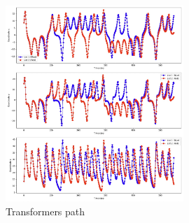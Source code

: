 \documentclass[11pt]{article}
\begin{document}
\begin{figure}[h]
\centering
\includegraphics[width=0.6\textwidth]{transformers_path.jpeg}
\caption{Transformers path}
\end{figure}



\end{document}
